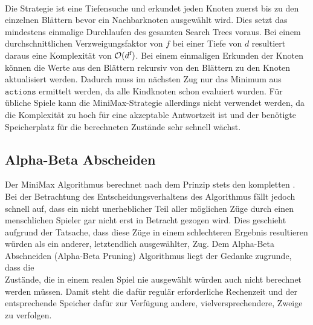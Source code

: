 \\ Die Strategie ist eine Tiefensuche und erkundet jeden Knoten zuerst bis zu den einzelnen Blättern bevor ein Nachbarknoten ausgewählt wird. Dies setzt das mindestens einmalige Durchlaufen des gesamten Search Trees voraus. Bei einem durchschnittlichen Verzweigungsfaktor von $f$ bei einer Tiefe von $d$ resultiert daraus eine Komplexität von $\mathcal{O}(d\textsuperscript{f})$. Bei einem einmaligen Erkunden der Knoten können die Werte aus den Blättern rekursiv von den Blättern zu den Knoten aktualisiert werden. Dadurch muss im nächsten Zug nur das Minimum aus $\mathtt{actions}$ ermittelt werden, da alle Kindknoten schon evaluiert wurden. Für übliche Spiele kann die MiniMax-Strategie allerdings nicht verwendet werden, da die Komplexität zu hoch für eine akzeptable Antwortzeit ist und der benötigte Speicherplatz für die berechneten Zustände sehr schnell wächst.
\subsection{Alpha-Beta Abscheiden}
\label{ab-pruning}
Der MiniMax Algorithmus berechnet nach dem Prinzip  stets den kompletten \gtree. 
\\Bei der Betrachtung des Entscheidungsverhaltens des Algorithmus fällt jedoch schnell auf, dass ein nicht unerheblicher Teil aller möglichen Züge durch einen menschlichen Spieler gar nicht erst in Betracht gezogen wird. Dies geschieht aufgrund der Tatsache, dass diese Züge in einem schlechteren Ergebnis resultieren würden als ein anderer, letztendlich ausgewählter, Zug.\newline
Dem Alpha-Beta Abschneiden (Alpha-Beta Pruning) Algorithmus liegt der Gedanke zugrunde, dass die \\Zustände, die in einem realen Spiel nie ausgewählt würden auch nicht berechnet werden müssen. Damit steht die dafür regulär erforderliche Rechenzeit und der entsprechende Speicher dafür zur Verfügung andere, vielversprechendere, Zweige zu verfolgen.
